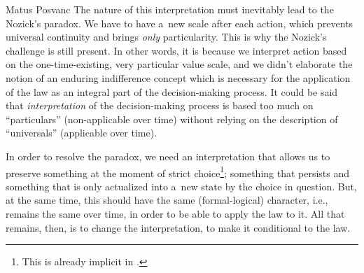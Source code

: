 \begin{artengenv}{Matus Posvanc}
The nature of this interpretation must inevitably lead to the Nozick's paradox. We have to have a~new scale after each action, which prevents universal continuity and brings \textit{only} particularity. This is why the Nozick's challenge is still present. In other words, it is because we interpret action based on the one-time-existing, very particular value scale, and we didn't elaborate the notion of an enduring indifference concept which is necessary for the application of the law as an integral part of the decision-making process. It could be said that \textit{interpretation} of the decision-making process is based too much on ``particulars'' (non-applicable over time) without relying on the description of ``universals'' (applicable over time).



In order to resolve the paradox, we need an interpretation that allows us to preserve something at the moment of strict choice\footnote{This is already implicit in 
\parencites[][]{Block1980On}[][]{Block2009Rejoinder}.%
}; something that persists and something that is only actualized into a~new state by the choice in question. But, at the same time, this should have the same (formal-logical) character, i.e., remains the same over time, in order to be able to apply the law to it. All that remains, then, is to change the interpretation, to make it conditional to the law.




\end{artengenv}
